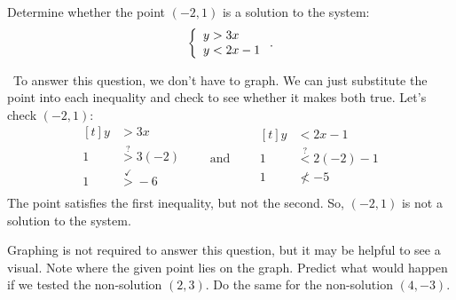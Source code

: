 \begin{boxedex}

Determine whether the point $(-2, 1)$ is a solution to the system: \[\left\{\begin{array}{l}y > 3x\\y < 2x-1\end{array}\right..\]

\exsoln\ To answer this question, we don't have to graph. We can just substitute the point into each inequality and check to see whether it makes both true. Let's check $(-2,1)$:
\[
\begin{aligned}[t]
y		&>3x\\
1		&\overset{?}{>}3(-2)\\
1 		&\overset{\checkmark}{>} -6\\
\end{aligned}
\qquad\text{and}\qquad
\begin{aligned}[t]
y 	&< 2x-1\\
1	&\overset{?}{<} 2(-2)-1\\
1	&{\nless} -5\\
\end{aligned}
\]
The point satisfies the first inequality, but not the second. So, $(-2,1)$ is not a solution to the system.

Graphing is not required to answer this question, but it may be helpful to see a visual. Note where the given point lies on the graph. Predict what would happen if we tested the non-solution $(2,3)$. Do the same for the non-solution $(4,-3)$.
\begin{center}
\end{center}
\end{boxedex}


